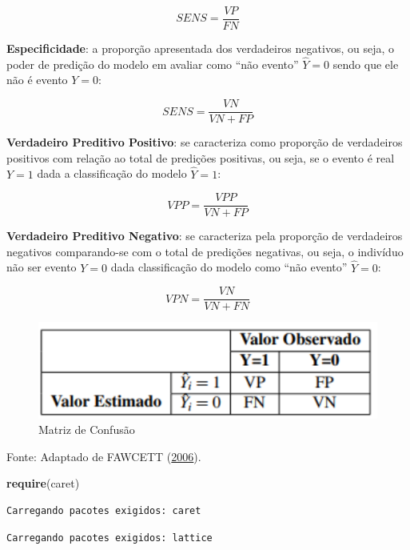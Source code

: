 \documentclass[12pt,brazil,oneside]{book}
\newenvironment{Shaded}{\begin{snugshade}}{\end{snugshade}}
\newcommand{\DataTypeTok}[1]{\textcolor[rgb]{0.13,0.29,0.53}{#1}}
\newcommand{\FloatTok}[1]{\textcolor[rgb]{0.00,0.00,0.81}{#1}}
\newcommand{\KeywordTok}[1]{\textcolor[rgb]{0.13,0.29,0.53}{\textbf{#1}}}
\newcommand{\NormalTok}[1]{#1}
\newcommand{\OperatorTok}[1]{\textcolor[rgb]{0.81,0.36,0.00}{\textbf{#1}}}
\newcommand{\StringTok}[1]{\textcolor[rgb]{0.31,0.60,0.02}{#1}}
\begin{document}
\[
SENS=\frac{VP}{FN}
\]

\textbf{Especificidade}: a proporção apresentada dos verdadeiros
negativos, ou seja, o poder de predição do modelo em avaliar como ``não
evento'' \(\hat Y=0\) sendo que ele não é evento \(Y=0\):

\[
SENS=\frac{VN}{VN+FP}
\]

\textbf{Verdadeiro Preditivo Positivo}: se caracteriza como proporção de
verdadeiros positivos com relação ao total de predições positivas, ou
seja, se o evento é real \(Y=1\) dada a classificação do modelo
\(\hat Y=1\):

\[
VPP=\frac{VPP}{VN+FP}
\]

\textbf{Verdadeiro Preditivo Negativo}: se caracteriza pela proporção de
verdadeiros negativos comparando-se com o total de predições negativas,
ou seja, o indivíduo não ser evento \(Y=0\) dada classificação do modelo
como ``não evento'' \(\hat Y=0\):

\[
VPN=\frac{VN}{VN+FN}
\]

\begin{figure}
\centering
\includegraphics{matriz.png}
\caption{Matriz de Confusão}
\end{figure}

Fonte: Adaptado de FAWCETT (\protect\hyperlink{ref-Fawcett2006}{2006}).

\begin{Shaded}
\begin{Highlighting}[]
\KeywordTok{require}\NormalTok{(caret)}
\end{Highlighting}
\end{Shaded}

\begin{verbatim}
Carregando pacotes exigidos: caret
\end{verbatim}

\begin{verbatim}
Carregando pacotes exigidos: lattice
\end{verbatim}

\begin{Shaded}
\end{Shaded}
\end{document}
